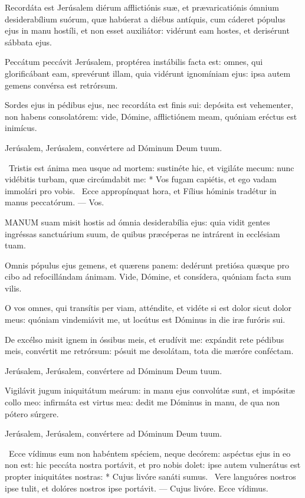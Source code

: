  Recordáta est Jerúsalem diérum afflictiónis suæ, et prævaricatiónis ómnium desiderabílium suórum, quæ habúerat a diébus antíquis, cum cáderet pópulus ejus in manu hostíli, et non esset auxiliátor: vidérunt eam hostes, et derisérunt sábbata ejus.

 Peccátum peccávit Jerúsalem, proptérea instábilis facta est: omnes, qui glorificábant eam, sprevérunt illam, quia vidérunt ignomíniam ejus: ipsa autem gemens convérsa est retrórsum.

 Sordes ejus in pédibus ejus, nec recordáta est finis sui: depósita est vehementer, non habens consolatórem: vide, Dómine, afflictiónem meam, quóniam eréctus est inimícus.

Jerúsalem, Jerúsalem, convértere ad Dóminum Deum tuum.

\R\ Tristis est ánima mea usque ad mortem: sustinéte hic, et vigiláte mecum: nunc vidébitis turbam, quæ circúmdabit me: * Vos fugam capiétis, et ego vadam immolári pro vobis. \V\ Ecce appropínquat hora, et Fílius hóminis tradétur in manus peccatórum. --- Vos.


 \lettrine[lines=2]{M}{ANUM} suam misit hostis ad ómnia desiderabília ejus: quia vidit gentes ingréssas sanctuárium suum, de quibus præcéperas ne intrárent in ecclésiam tuam.

 Omnis pópulus ejus gemens, et quærens panem: dedérunt pretiósa quæque pro cibo ad refocillándam ánimam. Vide, Dómine, et consídera, quóniam facta sum vilis.

 O vos omnes, qui transítis per viam, atténdite, et vidéte si est dolor sicut dolor meus: quóniam vindemiávit me, ut locútus est Dóminus in die iræ furóris sui.

 De excélso misit ignem in óssibus meis, et erudívit me: expándit rete pédibus meis, convértit me retrórsum: pósuit me desolátam, tota die mæróre conféctam.

Jerúsalem, Jerúsalem, convértere ad Dóminum Deum tuum.

 Vigilávit jugum iniquitátum meárum: in manu ejus convolútæ sunt, et impósitæ collo meo: infirmáta est virtus mea: dedit me Dóminus in manu, de qua non pótero súrgere.

Jerúsalem, Jerúsalem, convértere ad Dóminum Deum tuum.

\R\ Ecce vídimus eum non habéntem spéciem, neque decórem: aspéctus ejus in eo non est: hic peccáta nostra portávit, et pro nobis dolet: ipse autem vulnerátus est propter iniquitátes nostras: * Cujus livóre sanáti sumus. \V\ Vere languóres nostros ipse tulit, et dolóres nostros ipse portávit. --- Cujus livóre. Ecce vídimus.

